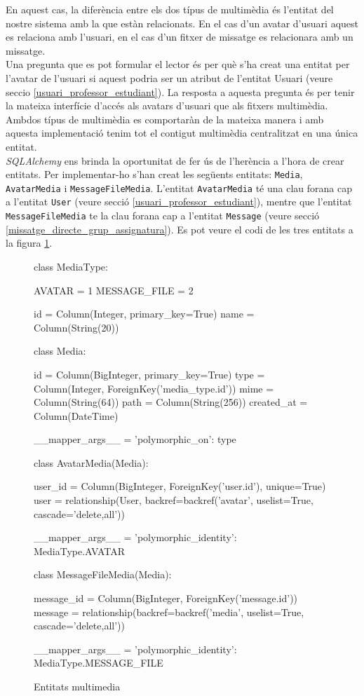 	En aquest cas, la diferència entre els dos típus de multimèdia és l'entitat del nostre sistema amb la que estàn relacionats. En el cas d'un avatar d'usuari aquest es relaciona amb l'usuari, en el cas d'un fitxer de missatge es relacionara amb un missatge.\\

	Una pregunta que es pot formular el lector és per què s'ha creat una entitat per l'avatar de l'usuari si aquest podria ser un atribut de l'entitat Usuari (veure seccio \ref{usuari_professor_estudiant}). La resposta a aquesta pregunta és per tenir la mateixa interfície d'accés als avatars d'usuari que als fitxers multimèdia. Ambdos típus de multimèdia es comportaràn de la mateixa manera i amb aquesta implementació tenim tot el contigut multimèdia centralitzat en una única entitat.	\\
	
	\emph{SQLAlchemy} ens brinda la oportunitat de fer ús de l'herència a l'hora de crear entitats. Per implementar-ho s'han creat les següents entitats: \texttt{Media}, \texttt{AvatarMedia} i \texttt{MessageFileMedia}. L'entitat \texttt{AvatarMedia} té una clau forana cap a l'entitat \texttt{User} (veure secció \ref{usuari_professor_estudiant}), mentre que l'entitat \texttt{MessageFileMedia} te la clau forana cap a l'entitat \texttt{Message} (veure secció \ref{missatge_directe_grup_assignatura}). Es pot veure el codi de les tres entitats a la figura \ref{fig:entitats_multimedia}. \\
	

\begin{figure}[p]
	\begin{python}
class MediaType:
	
	AVATAR = 1
	MESSAGE_FILE = 2
		
	id = Column(Integer, primary_key=True)
	name = Column(String(20))
    	
class Media:

    id = Column(BigInteger, primary_key=True)
    type = Column(Integer, ForeignKey('media_type.id'))
    mime = Column(String(64))
    path = Column(String(256))
    created_at = Column(DateTime)

    __mapper_args__ = {'polymorphic_on': type}

class AvatarMedia(Media):
	
    user_id = Column(BigInteger, ForeignKey('user.id'), unique=True)
    user = relationship(User,  backref=backref('avatar', uselist=True, cascade='delete,all'))

    __mapper_args__ = {'polymorphic_identity': MediaType.AVATAR}

class MessageFileMedia(Media):

    message_id = Column(BigInteger, ForeignKey('message.id'))
    message = relationship(backref=backref('media', uselist=True, cascade='delete,all'))

    __mapper_args__ = {'polymorphic_identity': MediaType.MESSAGE_FILE}
    	
	\end{python}
    \caption{Entitats multimedia}
    \label{fig:entitats_multimedia}
\end{figure}
   
